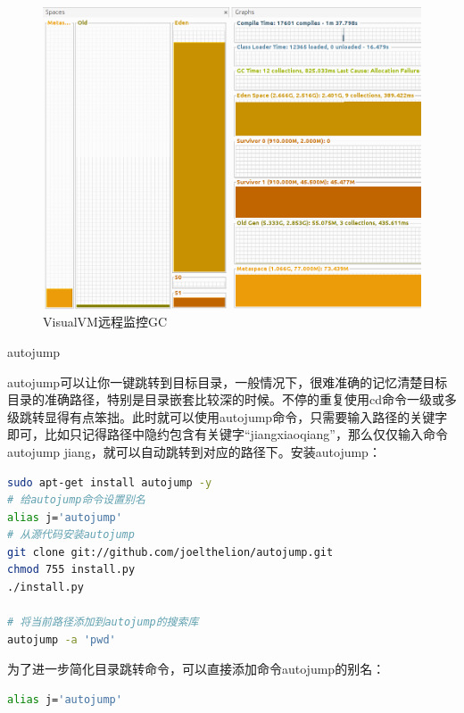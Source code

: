 \documentclass[12pt]{book}
\makeatletter
\numberwithin{dummy}{section}
\theoremstyle{ocrenumbox}
\theoremstyle{blacknumex}
\theoremstyle{blacknumbox}
\theoremstyle{ocrenum}
\renewcommand{\subsection}{\@startsection {subsection}{2}{\z@}
	{-3ex \@plus -0.1ex \@minus -.4ex}
	{0.5ex \@plus.2ex }
	{\normalfont\sffamily\bfseries}}
\makeatother
\begin{document}
\begin{figure}[htbp]
	\centering
	\includegraphics[scale=0.3]{monitorsystemmemory.png}
	\caption{VisualVM远程监控GC}
	\label{fig:monitorsystemmemory}
\end{figure}


\subsection{autojump}

autojump可以让你一键跳转到目标目录，一般情况下，很难准确的记忆清楚目标目录的准确路径，特别是目录嵌套比较深的时候。不停的重复使用cd命令一级或多级跳转显得有点笨拙。此时就可以使用autojump命令，只需要输入路径的关键字即可，比如只记得路径中隐约包含有关键字“jiangxiaoqiang”，那么仅仅输入命令autojump jiang，就可以自动跳转到对应的路径下。安装autojump：

\begin{lstlisting}[language=Bash]
sudo apt-get install autojump -y
# 给autojump命令设置别名
alias j='autojump'
# 从源代码安装autojump
git clone git://github.com/joelthelion/autojump.git
chmod 755 install.py
./install.py

# 将当前路径添加到autojump的搜索库
autojump -a 'pwd'
\end{lstlisting}

为了进一步简化目录跳转命令，可以直接添加命令autojump的别名：

\begin{lstlisting}[language=Bash]
alias j='autojump'
\end{lstlisting}
\end{document}
